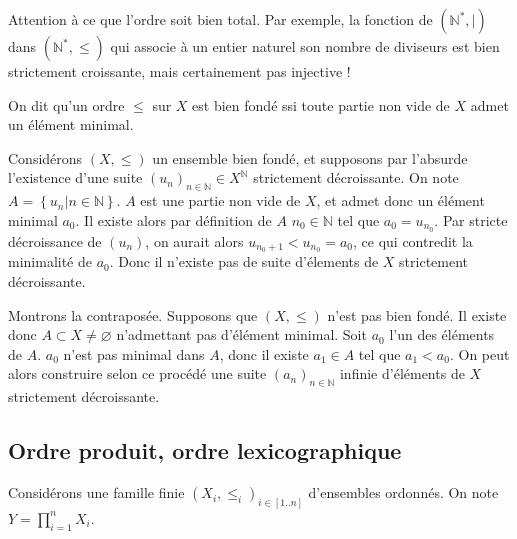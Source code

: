 \documentclass{scrartcl}
\begin{document}
			\rem Attention à ce que l'ordre soit bien total. 
				Par exemple, la fonction de $(\mathbb{N}^*,|)$ dans $(\mathbb{N}^*,\leq)$ 
				qui associe à un entier naturel son nombre de diviseurs est bien strictement croissante,
				mais certainement pas injective !

			On dit qu'un ordre $\leq$ sur $X$ est bien fondé ssi toute partie non vide de $X$ admet
			un élément minimal.

			\begin{demo}
				\item Considérons $(X,\leq)$ un ensemble bien fondé,
				et supposons par l'absurde l'existence d'une suite $(u_n)_{n\in\mathbb{N}}\in X^\mathbb{N}$ strictement décroissante.
				On note $A = \left\{u_n \big| n \in \mathbb{N}\right\}$.
				$A$ est une partie non vide de $X$, et admet donc un élément minimal $a_0$.
				Il existe alors par définition de $A$ $n_0\in\mathbb{N}$ tel que $a_0 = u_{n_0}$.
				Par stricte décroissance de $(u_n)$, on aurait alors  $u_{n_0+1} < u_{n_0} = a_0$, 
				ce qui contredit la minimalité de $a_0$. 
				Donc il n'existe pas de suite d'élements de $X$ strictement décroissante.
				\item Montrons la contraposée. 
				Supposons que $(X,\leq)$ n'est pas bien fondé. 
				Il existe donc $A\subset X \neq \varnothing$ n'admettant pas d'élément minimal.
				Soit $a_0$ l'un des éléments de $A$. 
				$a_0$ n'est pas minimal dans $A$, donc il existe $a_1 \in A$ tel que $a_1 < a_0$.
				On peut alors construire selon ce procédé une suite $(a_n)_{n\in\mathbb{N}}$ infinie
				d'éléments de $X$ strictement décroissante.
			\end{demo}
		\subsection{Ordre produit, ordre lexicographique}
			Considérons une famille finie $(X_i,\leq_i)_{i\in [1..n]}$ d'ensembles ordonnés.
			On note $Y = \prod_{i=1}^n X_i$.
			
\end{document}
